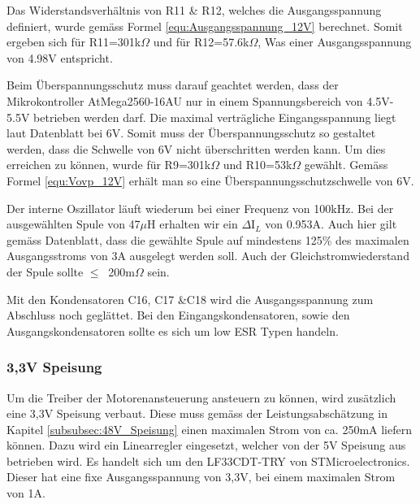 Das Widerstandsverhältnis von R11 \& R12, welches die Ausgangsspannung definiert, wurde gemäss Formel \ref{equ:Ausgangsspannung_12V} berechnet. Somit ergeben sich für R11=301k$\Omega$ und für R12=57.6k$\Omega$, Was einer Ausgangsspannung von 4.98V entspricht. \cite{mouser_mp24943dn-lf_nodate}

Beim Überspannungsschutz muss darauf geachtet werden, dass der Mikrokontroller AtMega2560-16AU nur in einem Spannungsbereich von 4.5V-5.5V betrieben werden darf. Die maximal verträgliche Eingangsspannung liegt laut Datenblatt bei 6V. Somit muss der Überspannungsschutz so gestaltet werden, dass die Schwelle von 6V nicht überschritten werden kann. Um dies erreichen zu können, wurde für R9=301k$\Omega$ und R10=53k$\Omega$ gewählt. Gemäss Formel \ref{equ:Vovp_12V} erhält man so eine Überspannungsschutzschwelle von 6V. \cite{mouser_mp24943dn-lf_nodate}

Der interne Oszillator läuft wiederum bei einer Frequenz von 100kHz. Bei der ausgewählten Spule von 47$\mu$H erhalten wir ein $\Delta$I$_{L}$ von 0.953A. Auch hier gilt gemäss Datenblatt, dass die gewählte Spule auf mindestens 125\% des maximalen Ausgangsstroms von 3A ausgelegt werden soll. Auch der Gleichstromwiederstand der Spule sollte $ \leq \ $ 200m$\Omega$  sein. \cite{mouser_mp24943dn-lf_nodate} 

Mit den Kondensatoren C16, C17 \&C18 wird die Ausgangsspannung zum Abschluss noch geglättet. Bei den Eingangskondensatoren, sowie den Ausgangskondensatoren sollte es sich um low ESR Typen handeln. \cite{mouser_mp24943dn-lf_nodate}
\newpage
\subsubsection{3,3V Speisung}
\label{subsubsec:3,3V_Speisung}

Um die Treiber der Motorenansteuerung ansteuern zu können, wird zusätzlich eine 3,3V Speisung verbaut. Diese muss gemäss der Leistungsabschätzung in Kapitel  \ref{subsubsec:48V_Speisung} einen maximalen Strom von ca. 250mA liefern können. Dazu wird ein Linearregler eingesetzt, welcher von der 5V Speisung aus betrieben wird. Es handelt sich um den LF33CDT-TRY  von STMicroelectronics. Dieser hat eine fixe Ausgangsspannung von 3,3V, bei einem maximalen Strom von 1A. \cite{noauthor_very_nodate}